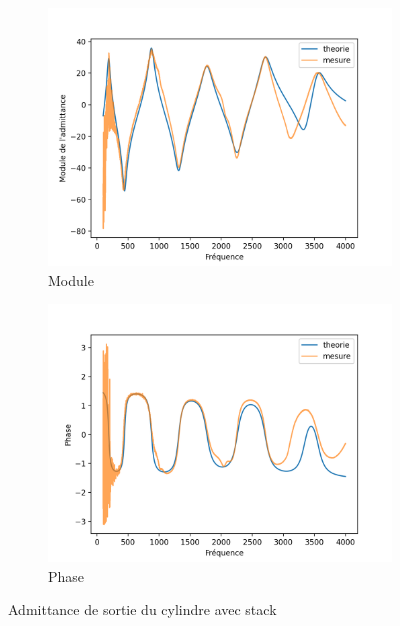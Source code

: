 \documentclass[atiam, article]{rapport} %
\begin{document}
\begin{figure}[H]
  \centering
  \begin{subfigure}[b]{.45\textwidth}
    \centering
    \includegraphics[width=\textwidth]{vents/images_vents/admittance_cylindre+stack_amp.png}
    \caption{Module}
    \label{subfig:admittance_cylindre+stack_amp}
  \end{subfigure}
  \begin{subfigure}[b]{.45\textwidth}
    \centering
    \includegraphics[width=\textwidth]{vents/images_vents/admittance_cylindre+stack_phase.png}
    \caption{Phase}
    \label{subfig:admittance_cylindre+stack_phase}
  \end{subfigure}
  \caption{Admittance de sortie du cylindre avec stack}
  \label{fig:admittance}
\end{figure}
\end{document}

